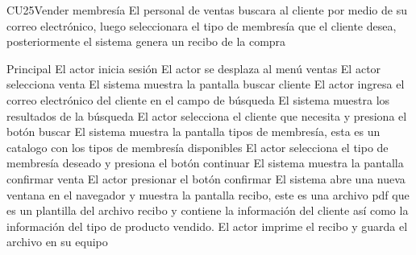 		

	\begin{UseCase}{CU25}{Vender membresía}{
		El personal de ventas buscara al cliente por medio de su correo electrónico, luego seleccionara el tipo de membresía que el cliente desea, posteriormente el sistema genera un recibo de la compra
	}
	\end{UseCase}
	\begin{UCtrayectoria}{Principal}
		\UCpaso El actor inicia sesión
		\UCpaso El actor se desplaza al menú ventas
		\UCpaso El actor selecciona venta
		\UCpaso El sistema muestra la pantalla buscar cliente
		\UCpaso El actor ingresa el correo electrónico del cliente en el campo de búsqueda 
		\UCpaso El sistema muestra los resultados de la búsqueda
		\UCpaso El actor selecciona el cliente que necesita y presiona el botón buscar
		\UCpaso El sistema muestra la pantalla tipos de membresía, esta es un catalogo con los tipos de membresía disponibles
		\UCpaso El actor selecciona el tipo de membresía deseado y presiona el botón continuar
		\UCpaso El sistema muestra la pantalla confirmar venta
		\UCpaso El actor presionar el botón confirmar
		\UCpaso El sistema abre una nueva ventana en el navegador y muestra la pantalla recibo, este es una archivo pdf que es un plantilla del archivo recibo y contiene la información del cliente así como la información del tipo de producto vendido.
		\UCpaso El actor imprime el recibo y guarda el archivo en su equipo
		
	\end{UCtrayectoria}
		
